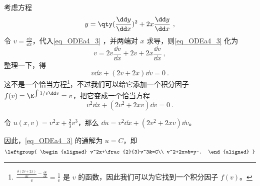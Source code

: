 \begin{example}{}\label{ex_ODEa4_2}


考虑方程
\begin{equation}\label{eq_ODEa4_3}
y=\qty(\frac{\dd y}{\dd x})^2+2x\frac{\dd y}{\dd x}~,
\end{equation}
令 $v=\frac{\dd y}{\dd x}$，代入\autoref{eq_ODEa4_3} ，并两端对 $x$ 求导，则\autoref{eq_ODEa4_3} 化为
\begin{equation}
v=2v\frac{\dd v}{\dd x}+2v+2x\frac{\dd v}{\dd x}~,
\end{equation}
整理一下，得
\begin{equation}
v\dd x+(2v+2x)\dd v=0~.
\end{equation}
这不是一个恰当方程\footnote{$\frac{\frac{\partial (2v+2x)}{\partial x}-\frac{\partial v}{\partial v}}{v}=\frac{1}{v}$ 是 $v$ 的函数，因此我们可以为它找到一个积分因子 $f(v)$。}，不过我们可以给它添加一个积分因子 $f(v)=\E^{\int 1/v \dd v}=v$，把它变成一个恰当方程
\begin{equation}
v^2\dd x+(2v^2+2xv)\dd v=0~.
\end{equation}

令 $u(x, v)=v^2x+\frac{2}{3}v^3$，那么 $\dd u=v^2\dd x+(2v^2+2xv)\dd v$。

因此，\autoref{eq_ODEa4_3} 的通解为 $u=C$，即
\begin{equation}
\leftgroup{
    \begin{aligned}
    v^2x+\frac{2}{3}v^3&=C\\
    v^2+2xv&=y~.
    \end{aligned}
}
\end{equation}



\end{example}


